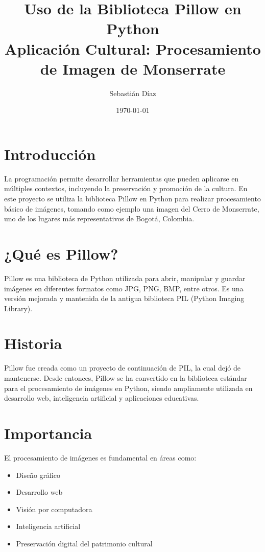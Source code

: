 \documentclass[12pt]{article}
\title{Uso de la Biblioteca Pillow en Python \\
Aplicación Cultural: Procesamiento de Imagen de Monserrate}
\author{Sebastián Díaz}
\date{\today}
\begin{document}
\maketitle
\newpage

\tableofcontents
\newpage

\section{Introducción}

La programación permite desarrollar herramientas que pueden aplicarse en múltiples contextos, incluyendo la preservación y promoción de la cultura. En este proyecto se utiliza la biblioteca Pillow en Python para realizar procesamiento básico de imágenes, tomando como ejemplo una imagen del Cerro de Monserrate, uno de los lugares más representativos de Bogotá, Colombia.

\section{¿Qué es Pillow?}

Pillow es una biblioteca de Python utilizada para abrir, manipular y guardar imágenes en diferentes formatos como JPG, PNG, BMP, entre otros. Es una versión mejorada y mantenida de la antigua biblioteca PIL (Python Imaging Library).

\section{Historia}

Pillow fue creada como un proyecto de continuación de PIL, la cual dejó de mantenerse. Desde entonces, Pillow se ha convertido en la biblioteca estándar para el procesamiento de imágenes en Python, siendo ampliamente utilizada en desarrollo web, inteligencia artificial y aplicaciones educativas.

\section{Importancia}

El procesamiento de imágenes es fundamental en áreas como:

\begin{itemize}
\item Diseño gráfico
\item Desarrollo web
\item Visión por computadora
\item Inteligencia artificial
\item Preservación digital del patrimonio cultural
\end{itemize}
\end{document}
